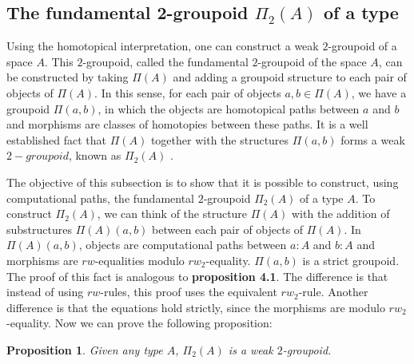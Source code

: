 \documentclass[12pt, a4paper,  oneside, headinclude,footinclude, BCOR5mm]{scrartcl}
\newtheorem{proposition}{Proposition}[section]
\begin{document}
\subsection{The fundamental 2-groupoid $\Pi_{2}(A)$ of a type}

Using the homotopical interpretation, one can construct a weak $2$-groupoid of a space $A$. This $2$-groupoid, called the fundamental $2$-groupoid of the space $A$, can be constructed by taking $\Pi(A)$ and adding a groupoid structure to each pair of objects of $\Pi(A)$. In this sense, for each pair of objects $a, b \in \Pi(A)$, we have a groupoid $\Pi(a,b)$, in which the objects are homotopical paths between $a$ and $b$ and morphisms are classes of homotopies between these paths. It is a well established fact that $\Pi(A)$ together with the structures $\Pi(a,b)$ forms a weak $2-groupoid$, known as $\Pi_{2}(A)$ \cite{Tom}.

The objective of this subsection is to show that it is possible to construct, using computational paths, the fundamental $2$-groupoid $\Pi_{2}(A)$ of a type $A$. To construct $\Pi_{2}(A)$, we can think of the structure $\Pi(A)$ with the addition of substructures $\Pi(A)(a,b)$ between each pair of objects of $\Pi(A)$. In $\Pi(A)(a,b)$, objects are computational paths between $a : A$ and $b : A$ and morphisms are $rw$-equalities modulo $rw_{2}$-equality. $\Pi(a,b)$ is a strict groupoid. The proof of this fact is analogous to \textbf{proposition 4.1}. The difference is that instead of using $rw$-rules, this proof uses the equivalent $rw_{2}$-rule. Another difference is that the equations hold strictly, since the morphisms are modulo $rw_{2}$-equality. Now we can prove the following proposition:

\begin{proposition}

Given any type $A$, $\Pi_{2}(A)$ is a weak $2$-groupoid.

\end{proposition}
\end{document}
